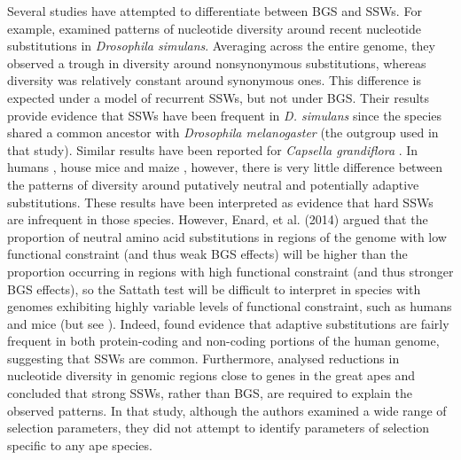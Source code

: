	Several studies have attempted to differentiate between BGS and SSWs. For example, \cite{RN167} examined patterns of nucleotide diversity around recent nucleotide substitutions in \textit{Drosophila simulans}. Averaging across the entire genome, they observed a trough in diversity around nonsynonymous substitutions, whereas diversity was relatively constant around synonymous ones. This difference is expected under a model of recurrent SSWs, but not under BGS. Their results provide evidence that SSWs have been frequent in \textit{D. simulans} since the species shared a common ancestor with \textit{Drosophila melanogaster} (the outgroup used in that study). Similar results have been reported for \textit{Capsella grandiflora} \citep{RN236}. In humans \citep{RN162}, house mice \citep{RN122} and maize \citep{RN230}, however, there is very little difference between the patterns of diversity around putatively neutral and potentially adaptive substitutions. These results have been interpreted as evidence that hard SSWs are infrequent in those species. However, Enard, et al. (2014) argued that the proportion of neutral amino acid substitutions in regions of the genome with low functional constraint (and thus weak BGS effects) will be higher than the proportion occurring in regions with high functional constraint (and thus stronger BGS effects), so the Sattath test will be difficult to interpret in species with genomes exhibiting highly variable levels of functional constraint, such as humans and mice (but see \citealt{RN230}). Indeed, \cite{RN237} found evidence that adaptive substitutions are fairly frequent in both protein-coding and non-coding portions of the human genome, suggesting that SSWs are common. Furthermore, \cite{RN365} analysed reductions in nucleotide diversity in genomic regions close to genes in the great apes and concluded that strong SSWs, rather than BGS, are required to explain the observed patterns. In that study, although the authors examined a wide range of selection parameters, they did not attempt to identify parameters of selection specific to any ape species.

